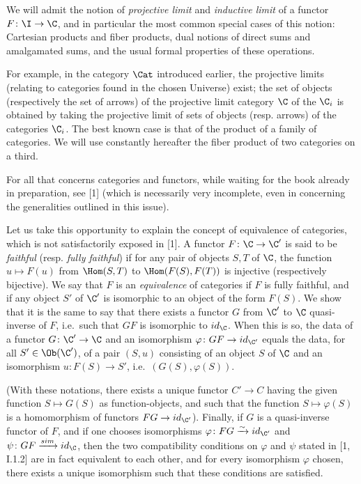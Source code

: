 We will admit the notion of \emph{projective limit} and \emph{inductive limit} of a functor $F \colon \I \to \C$, and in particular the most common special cases of this notion:
Cartesian products and fiber products, dual notions of direct sums and amalgamated sums, and the usual formal properties of these operations.

For example, in the category $\Cat$ introduced earlier, the projective limits
(relating to categories found in the chosen Universe) exist; the set of objects (respectively the set of arrows) of the projective limit category $\C$ of the $\C_i$ is obtained by taking the projective limit of sets of objects (resp. arrows) of the categories $\C_i$. The best known case is that of the product of a family of
categories. We will use constantly hereafter the fiber product of two categories
on a third.

For all that concerns categories and functors, while waiting for the book already in preparation, see [1] (which is necessarily very incomplete, even in
concerning the generalities outlined in this issue).

Let us take this opportunity to explain the concept of equivalence of categories, which is not satisfactorily exposed in [1]. 
A functor $F \colon \C \to \C'$ is said to be \emph{faithful} (resp. \emph{fully faithful}) if for any pair of objects $S, T$ of $\C$, the function $u \mapsto F (u)$ from $\Hom (S, T)$ to $\Hom (F (S), F (T))$ is injective (respectively bijective). 
We say that $F$ is an \emph{equivalence} of categories if $F$ is fully faithful, and if any object $S'$ of $\C'$ is isomorphic to an object of the form $F (S)$.
We show that it is the same to say that there exists a functor $G$ from $\C'$ to $\C$ quasi-inverse of $F$, i.e.\ such that $GF$ is isomorphic to $id_\C$.
When this is so, the data of a functor $G \colon \C' \to \C$ and an isomorphism $\varphi \colon GF \to id_{\C'}$ equals the data, for all $S' \in \Ob (\C')$, of a pair $(S, u)$ consisting of an object $S$ of $\C$ and an isomorphism $u \colon F (S) \to S'$, i.e.\ $(G (S), \varphi (S))$.

(With these notations, there exists a unique functor $C' \to C$ having the given function $S \mapsto G (S)$ as function-objects, and such that the function $S \mapsto \varphi (S)$ is a homomorphism of functors $FG \to id_{\C'}$).
%
Finally, if $G$ is a quasi-inverse functor of $F$, and if one chooses isomorphisms $\varphi \colon FG \xrightarrow{\sim} id_{\C'}$ and $\psi \colon GF \xrightarrow{sim} id_\C$, then the two compatibility conditions on $\varphi$ and $\psi$ stated in [1, I.1.2] are in fact equivalent to each other, and for every isomorphism $\varphi$ chosen, there exists a unique isomorphism such that these conditions are satisfied.

